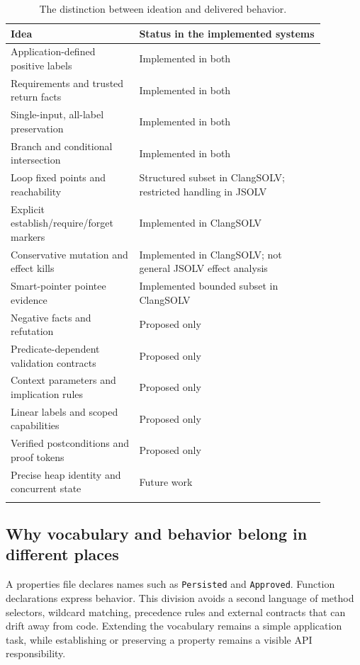 \documentclass[11pt]{article}
\begin{document}
\begin{longtable}{>{\raggedright\arraybackslash}p{0.36\linewidth}>{\raggedright\arraybackslash}p{0.52\linewidth}}
\toprule
Idea & Status in the implemented systems\\\midrule
\endhead
Application-defined positive labels & Implemented in both\\
Requirements and trusted return facts & Implemented in both\\
Single-input, all-label preservation & Implemented in both\\
Branch and conditional intersection & Implemented in both\\
Loop fixed points and reachability & Structured subset in ClangSOLV; restricted handling in JSOLV\\
Explicit establish/require/forget markers & Implemented in ClangSOLV\\
Conservative mutation and effect kills & Implemented in ClangSOLV; not general JSOLV effect analysis\\
Smart-pointer pointee evidence & Implemented bounded subset in ClangSOLV\\
Negative facts and refutation & Proposed only\\
Predicate-dependent validation contracts & Proposed only\\
Context parameters and implication rules & Proposed only\\
Linear labels and scoped capabilities & Proposed only\\
Verified postconditions and proof tokens & Proposed only\\
Precise heap identity and concurrent state & Future work\\
\bottomrule
\caption{The distinction between ideation and delivered behavior.}
\end{longtable}

\subsection{Why vocabulary and behavior belong in different places}
A properties file declares names such as \texttt{Persisted} and
\texttt{Approved}. Function declarations express behavior. This division
avoids a second language of method selectors, wildcard matching, precedence
rules and external contracts that can drift away from code. Extending the
vocabulary remains a simple application task, while establishing or preserving
a property remains a visible API responsibility.
\end{document}
